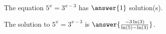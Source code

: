 \documentclass{ximera}
\author{Kenneth Berglund}
\begin{document}
\begin{exercise}
The equation $5^x = 3^{x - 3}$ has $\answer{1}$ solution(s).

\begin{exercise}
The solution to $5^x = 3^{x - 3}$ is $\answer{\frac{-3\ln(3)}{\ln(5) - \ln(3)}}$.
\end{exercise}

\end{exercise}
\end{document}
